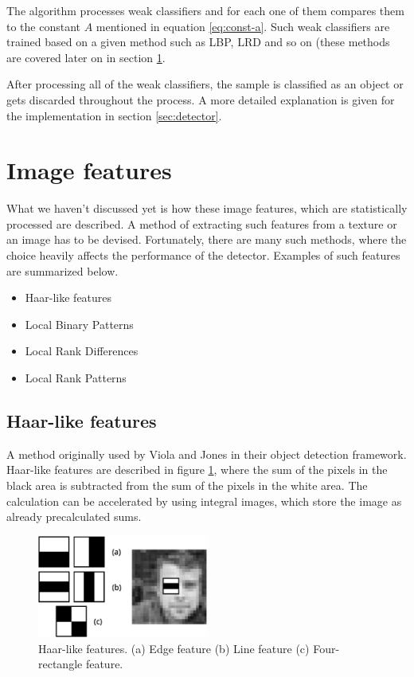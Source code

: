 The algorithm processes weak classifiers and for each one of them compares them to the constant $A$ mentioned in equation \ref{eq:const-a}. Such weak classifiers are trained based on a given method such as LBP, LRD and so on (these methods are covered later on in section \ref{sec:app-image-features}.

After processing all of the weak classifiers, the sample is classified as an object or gets discarded throughout the process. A more detailed explanation is given for the implementation in section \ref{sec:detector}.

\section{Image features}\label{sec:app-image-features}

What we haven't discussed yet is how these image features, which are statistically processed are described. A method of extracting such features from a texture or an image has to be devised. Fortunately, there are many such methods, where the choice heavily affects the performance of the detector. Examples of such features are summarized below.

\begin{itemize}
	\item Haar-like features \cite{Viola01rapidobject}
	\item Local Binary Patterns \cite{Ojala02multiresolutiongrayscale}
	\item Local Rank Differences \cite{herout2008impl}
	\item Local Rank Patterns \cite{Hradis08localrank}
\end{itemize}

\subsection{Haar-like features}

A method originally used by Viola and Jones \cite{Viola01rapidobject} in their object detection framework. Haar-like features are described in figure \ref{fig:haar}, where the sum of the pixels in the black area is subtracted from the sum of the pixels in the white area. The calculation can be accelerated by using integral images, which store the image as already precalculated sums.

\begin{center}
\begin{figure}[ht]
	\centering\includegraphics[width=0.5\textwidth]{fig/haar.eps}
	\caption{Haar-like features. (a) Edge feature (b) Line feature (c) Four-rectangle feature.}
	\label{fig:haar}
\end{figure}
\end{center}

